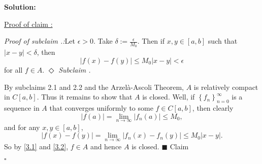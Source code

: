 \documentclass[12pt]{article}
\newcounter{ProofCounter}
\newcounter{ClaimCounter}[ProofCounter]
\newcounter{SubClaimCounter}[ClaimCounter]
\newenvironment{Solution}{\stepcounter{ProofCounter}\textbf{Solution:}}{\hfill$\square$}
\newenvironment{claimproof}[1]{\par\noindent\underline{Proof of claim \theClaimCounter:}\space#1}{\hfill $\blacksquare$ Claim \theClaimCounter}
\newenvironment{subclaim}[1]{\stepcounter{SubClaimCounter}\par\noindent\emph{Subclaim \theClaimCounter.\theSubClaimCounter:}\space#1}{}
\newenvironment{subclaimproof}[1]{\par\noindent\emph{Proof of subclaim \theClaimCounter.\theSubClaimCounter:}\space#1}{\hfill
$\Diamond$ \emph{Subclaim \theClaimCounter.\theSubClaimCounter}}
\begin{document}
\begin{Solution}
\begin{claimproof}
    \begin{subclaimproof}
      Let $\epsilon > 0$. Take $\delta := \frac{\epsilon}{M_0}$. Then if $x,y \in [a,b]$ such that $|x - y| < \delta$, then
      \[
        |f(x) - f(y)| \leq M_0|x - y| < \epsilon
      \]
      for all $f \in A$.
    \end{subclaimproof}

    By subclaims 2.1 and 2.2 and the Arzel{\`a}-Ascoli Theorem, $A$ is relatively compact in $C[a,b]$. Thus it remains to show that $A$ is closed.
    Well, if $\left\{ f_n \right\}_{n=0}^{\infty}$ is a sequence in $A$ that converges uniformly to some $f \in C[a,b]$, then clearly 
    \begin{equation}
      |f(a)| = \lim_{n\rightarrow\infty}|f_{n}(a)| \leq M_0,
      \label{3.1}
    \end{equation}
    and for any $x, y \in [a,b]$,
    \begin{equation}
      |f(x) - f(y)| = \lim_{n\rightarrow\infty}|f_n(x) - f_n(y)| \leq M_0 |x - y|.
      \label{3.2}
    \end{equation}
    So by \eqref{3.1} and \eqref{3.2}, $f \in A$ and hence $A$ is closed.
  \end{claimproof}

\end{Solution}
\end{document}
